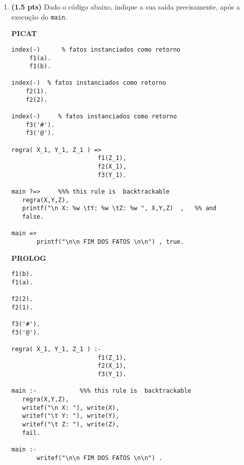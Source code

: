 \documentclass[11pt, a4paper,final]{article}
\begin{document}
\begin{enumerate}
\newpage


\item {\bf (1.5 pts)} Dado o código abaixo, indique a sua saída precisamente, após
  a execução do \texttt{main}. 

\begin{minipage}{0.45\textwidth}
\begin{tiny}
\begin{center}{\bf PICAT}\end{center}
\begin{verbatim}
index(-)      % fatos instanciados como retorno
     f1(a).
     f1(b).
	
index(-)  % fatos instanciados como retorno
    f2(1).
    f2(2).
	
index(-)     % fatos instanciados como retorno
    f3('#').
    f3('@').
    
regra( X_1, Y_1, Z_1 ) =>     
                      	f1(Z_1),
          	            f2(X_1),
          	            f3(Y_1).

main ?=>     %%% this rule is  backtrackable
   regra(X,Y,Z),                            
   printf("\n X: %w \tY: %w \tZ: %w ", X,Y,Z)  ,   %% and
   false.

main => 
       printf("\n\n FIM DOS FATOS \n\n") , true. 
\end{verbatim}
\end{tiny}
\end{minipage}
\begin{minipage}{0.45\textwidth}
\begin{tiny}
\begin{center}{\bf PROLOG}\end{center}
\begin{verbatim}
f1(b).
f1(a).
    
f2(2).
f2(1).
    	
f3('#').
f3('@').
    
regra( X_1, Y_1, Z_1 ) :-
                      	f1(Z_1),
          	            f2(X_1),
          	            f3(Y_1).

main :-            %%% this rule is  backtrackable
   regra(X,Y,Z),                            
   writef("\n X: "), write(X),
   writef("\t Y: "), write(Y),
   writef("\t Z: "), write(Z), 
   fail.

main :- 
       writef("\n\n FIM DOS FATOS \n\n") . 
\end{verbatim}
\end{tiny}
\end{minipage}


\end{enumerate}
\end{document}
